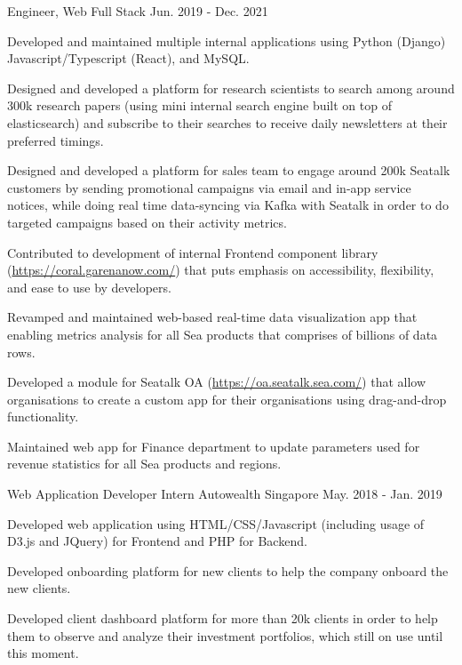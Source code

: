 \begin{cventries}
  \cventry
  {Engineer, Web Full Stack} %
  {} %
  {} %
  {Jun. 2019 - Dec. 2021} %
  {
    \begin{cvitems} %
      \item {Developed and maintained multiple internal applications using Python (Django) Javascript/Typescript (React), and MySQL.}
      \item {Designed and developed a platform for research scientists to search among around 300k research papers (using mini internal search engine built on top of elasticsearch) and subscribe to their searches to receive daily newsletters at their preferred timings.}
      \item {Designed and developed a platform for sales team to engage around 200k Seatalk customers by sending promotional campaigns via email and in-app service notices, while doing real time data-syncing via Kafka with Seatalk in order to do targeted campaigns based on their activity metrics.}
      \item {Contributed to development of internal Frontend component library (\url{https://coral.garenanow.com/}) that puts emphasis on accessibility, flexibility, and ease to use by developers.}
      \item {Revamped and maintained web-based real-time data visualization app that enabling metrics analysis for all Sea products that comprises of billions of data rows.}
      \item {Developed a module for Seatalk OA (\url{https://oa.seatalk.sea.com/}) that allow organisations to create a custom app for their organisations using drag-and-drop functionality.}
      \item {Maintained web app for Finance department to update parameters used for revenue statistics for all Sea products and regions.}
    \end{cvitems}
  }

  \cventry
    {Web Application Developer Intern} %
    {Autowealth} %
    {Singapore} %
    {May. 2018 - Jan. 2019} %
    {
      \begin{cvitems} %
        \item {Developed web application using HTML/CSS/Javascript (including usage of D3.js and JQuery) for Frontend and PHP for Backend.}
        \item {Developed onboarding platform for new clients to help the company onboard the new clients.}
        \item {Developed client dashboard platform for more than 20k clients in order to help them to observe and analyze their investment portfolios, which still on use until this moment.}
      \end{cvitems}
    }

\end{cventries}
